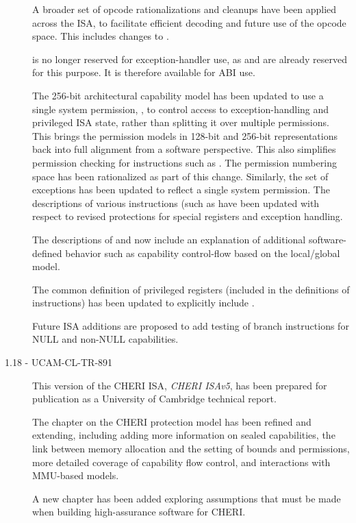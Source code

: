\begin{description}
  A broader set of opcode rationalizations and cleanups have been applied
  across the ISA, to facilitate efficient decoding and future use of the
  opcode space.
  This includes changes to .

   is no longer reserved for exception-handler use, as  and
   are already reserved for this purpose.
  It is therefore available for ABI use.

  The 256-bit architectural capability model has been updated to use a single
  system permission, \cappermASR, to control access to
  exception-handling and privileged ISA state, rather than splitting it over
  multiple permissions.
  This brings the permission models in 128-bit and 256-bit representations
  back into full alignment from a software perspective.
  This also simplifies permission checking for instructions such as
  .
  The permission numbering space has been rationalized as part of this change.
  Similarly, the set of exceptions has been updated to reflect a single system
  permission.
  The descriptions of various instructions (such as 
  have been updated with respect to revised protections for special registers
  and exception handling.

  The descriptions of  and  now
  include an explanation of additional software-defined behavior such as
  capability control-flow based on the local/global model.

  The common definition of privileged registers (included in the definitions
  of instructions) has been updated to explicitly include \EPCC{}.

  Future ISA additions are proposed to add testing of branch instructions for
  NULL and non-NULL capabilities.

\item[1.18 - UCAM-CL-TR-891] This version of the CHERI ISA,
  \textit{CHERI ISAv5}, has been prepared for publication as a University of
  Cambridge technical report.

  The chapter on the CHERI protection model has been refined and extending,
  including adding more information on sealed capabilities, the link between
  memory allocation and the setting of bounds and permissions, more detailed
  coverage of capability flow control, and interactions with MMU-based models.

  A new chapter has been added exploring assumptions that must be made when
  building high-assurance software for CHERI.


\end{description}
